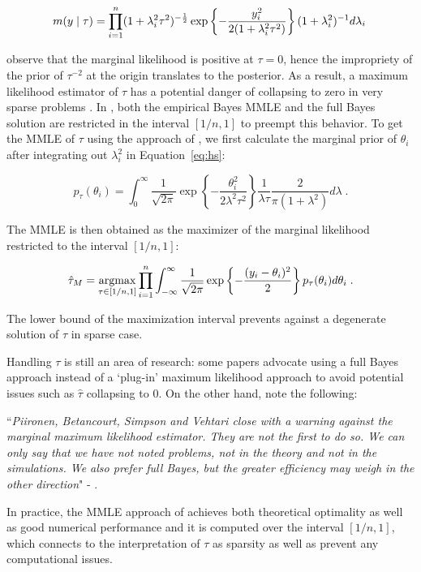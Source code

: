 \documentclass[sts,preprint]{imsart}
\begin{document}
\[
  m(y \mid \tau) = \prod_{i=1}^{n} (1+\lambda_i^2 \tau^2)^{-\frac{1}{2}} \exp \left \{ - \frac{y_i^2}{2(1+\lambda_i^2 \tau^2)} \right \}  (1+\lambda_i^2)^{-1} d \lambda_i \;
\]

\citet{tiao1965bayesian} observe that the marginal likelihood is positive at $\tau = 0$, hence the impropriety of the prior of $\tau^{-2}$ at the origin translates to the posterior. As a result, a maximum likelihood estimator of $\tau$ has a potential danger of collapsing to zero in very sparse problems \citep{polson2010shrink, datta2013asymptotic}. In \cite{van2017adaptive}, both the empirical Bayes MMLE and the full Bayes solution are restricted in the interval $[1/n,1]$ to preempt this behavior. To get the MMLE of $\tau$ using the approach of \cite{van2017adaptive}, we first calculate the marginal prior of $\theta_i$ after integrating out $\lambda_i^2$ in Equation~\eqref{eq:hs}:

\[
p_{\tau}(\theta_i) = \int_{0}^{\infty} \frac{1}{\sqrt{2 \pi}} \exp \left\{ -
  \frac{\theta_i^2}{2\lambda^2 \tau^2} \right\} \frac{1}{\lambda \tau}
  \frac{2}{\pi(1+\lambda^2)} d\lambda
  \;.
\]

The MMLE is then obtained as the maximizer of the marginal likelihood restricted to the interval $[1/n,1]$: 

\[
  \hat{\tau}_M = \argmax_{\tau \in [1/n,1]} \prod_{i=1}^{n}
  \int_{-\infty}^{\infty} \frac{1}{\sqrt{2 \pi}} \exp \left\{ - \frac{(y_i
  -\theta_i)^2}{2} \right\} p_{\tau}(\theta_i) d\theta_i
  \;.
\]

The lower bound of the maximization interval prevents against a degenerate solution of $\tau$ in sparse case. 

Handling $\tau$ is still an area of research: some papers \citep[][e.g.]{carvalho2010horseshoe, datta2013asymptotic,piironen2017sparsity} advocate using a full Bayes approach instead of a `plug-in' maximum likelihood approach to avoid potential issues such as $\hat{\tau}$ collapsing to 0. On the other hand, \citet{van2017adaptive} note the following: 

``\textit{Piironen, Betancourt, Simpson and Vehtari close with a warning against the marginal maximum likelihood estimator. They are not the first to do so. We can only say that we have not noted problems, not in the theory and not in the simulations. We also prefer full Bayes, but the greater efficiency may weigh in 
the other direction}" - \cite[\textit{vide} Rejoinder p. 1274]{van2017adaptive}. 


In practice, the MMLE approach of \cite{van2017adaptive} achieves both theoretical optimality as well as good numerical performance and it is computed over the interval $[1/n,1]$, which connects to the interpretation of $\tau$ as sparsity as well as prevent any computational issues. 
\end{document}
